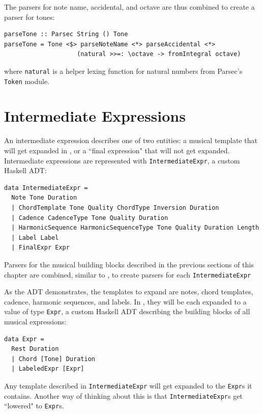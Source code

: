 \documentclass{report}
\begin{document}
The parsers for note name, accidental, and octave are thus combined to create a parser for tones:

\begin{verbatim}
parseTone :: Parsec String () Tone 
parseTone = Tone <$> parseNoteName <*> parseAccidental <*> 
		            (natural >>=: \octave -> fromIntegral octave)
\end{verbatim}
where \verb.natural. is a helper lexing function for natural numbers from Parsec's \verb.Token. module.

\section{Intermediate Expressions}

An intermediate expression describes one of two entities: a musical template that will get expanded in , or a ``final expression" that will not get expanded. Intermediate expressions are represented with \verb.IntermediateExpr., a custom Haskell ADT:

\begin{verbatim}
data IntermediateExpr = 
  Note Tone Duration
  | ChordTemplate Tone Quality ChordType Inversion Duration
  | Cadence CadenceType Tone Quality Duration
  | HarmonicSequence HarmonicSequenceType Tone Quality Duration Length 
  | Label Label
  | FinalExpr Expr
\end{verbatim}

Parsers for the musical building blocks described in the previous sections of this chapter are combined, similar to , to create parsers for each \verb.IntermediateExpr.

As the ADT demonstrates, the templates to expand are notes, chord templates, cadence, harmonic sequences, and labels. In , they will be each expanded to a value of type \verb.Expr., a custom Haskell ADT describing the building blocks of all musical expressions:

\begin{verbatim}
data Expr = 
  Rest Duration
  | Chord [Tone] Duration
  | LabeledExpr [Expr]
\end{verbatim}

Any template described in \verb.IntermediateExpr. will get expanded to the \verb.Expr.s it contains. Another way of thinking about this is that \verb.IntermediateExpr.s get ``lowered" to \verb.Expr.s.
\end{document}
